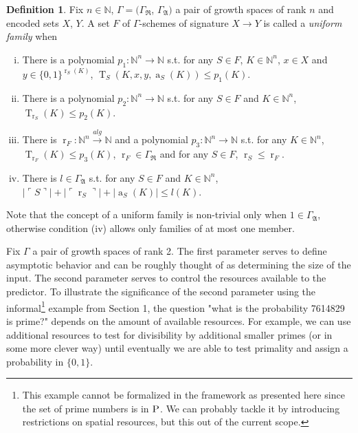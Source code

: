 \documentclass{article}
\theoremstyle{definition}
\newtheorem{definition}{Definition}[section]
\theoremstyle{plain}
\newcommand{\WordsLen}[1]{{\{ 0, 1 \}^{#1}}}
\DeclareMathOperator{\T}{T}
\DeclareMathOperator{\R}{r}
\DeclareMathOperator{\A}{a}
\newcommand{\Nats}{\mathbb{N}}
\newcommand{\Abs}[1]{\lvert #1 \rvert}
\newcommand{\Quote}[1]{\ulcorner #1 \urcorner}
\begin{document}
\begin{definition}

Fix $n \in \Nats$, $\Gamma=(\Gamma_{\mathfrak{R}}$, $\Gamma_{\mathfrak{A}})$ a pair of growth spaces of rank $n$ and encoded sets $X$, $Y$. A set $F$ of $\Gamma$-schemes of signature $X \rightarrow Y$ is called a \emph{uniform family} when

\begin{enumerate}[(i)]

\item There is a polynomial $p_1: \Nats^n \rightarrow \Nats$ s.t. for any $S \in F$, $K \in \Nats^n$, $x \in X$ and $y \in \WordsLen{\R_S(K)}$, $\T_S(K,x,y,\A_S(K)) \leq p_1(K)$.

\item There is a polynomial $p_2: \Nats^n \rightarrow \Nats$ s.t. for any $S \in F$ and $K \in \Nats^n$, $\T_{\R_S}(K) \leq p_2(K)$.

\item There is $\R_F: \Nats^n \xrightarrow{alg} \Nats$ and a polynomial $p_3: \Nats^n \rightarrow \Nats$ s.t. for any $K \in \Nats^n$, $\T_{\R_F}(K) \leq p_3(K)$, $\R_F \in \Gamma_{\mathfrak{R}}$ and for any $S \in F$, $\R_S \leq \R_F$.

\item There is $l \in \Gamma_{\mathfrak{A}}$ s.t. for any $S \in F$ and $K \in \Nats^n$, ${\Abs{\Quote{S}} + \Abs{\Quote{\R_S}} + \Abs{\A_S(K)} \leq l(K)}$.

\end{enumerate}

\end{definition}

Note that the concept of a uniform family is non-trivial only when $1 \in \Gamma_{\mathfrak{A}}$, otherwise condition (iv) allows only families of at most one member.

Fix $\Gamma$ a pair of growth spaces of rank 2. The first parameter serves to define asymptotic behavior and can be roughly thought of as determining the size of the input. The second parameter serves to control the resources available to the predictor. To illustrate the significance of the second parameter using the informal\footnote{This example cannot be formalized in the framework as presented here since the set of prime numbers is in $\textsc{P}$. We can probably tackle it by introducing restrictions on spatial resources, but this out of the current scope.} example from Section 1, the question "what is the probability 7614829 is prime?" depends on the amount of available resources. For example, we can use additional resources to test for divisibility by additional smaller primes (or in some more clever way) until eventually we are able to test primality and assign a probability in $\{0,1\}$.
\end{document}
